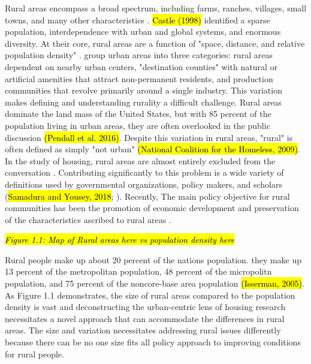  Rural areas encompass a broad spectrum, including farms, ranches, villages, small towns, and many other characteristics \citep{cromartie_defining_2008}.  \hl{Castle (1998)} identified a sparse population, interdependence with urban and global systems, and enormous diversity.  At their core, rural areas are a function of "space, distance, and relative population density" \citep[?]{castle_place_2011}.\citet{shoup_principles_2010} group urban areas into three categories: rural areas dependent on nearby urban centers, "destination counties" with natural or artificial amenities that attract non-permanent residents, and production communities that revolve primarily around a single industry. This variation  makes defining and understanding rurality a difficult challenge. Rural areas dominate the land mass of the United States, but with 85 percent of the population living in urban areas, they are often overlooked in the public discussion \hl{(Pendall et al. 2016)}. Despite this variation in rural areas,  "rural" is often defined as simply "not urban" \hl{(National Coalition for the Homeless, 2009)}. In the study of housing, rural areas are almost entirely excluded from the conversation \citep{gkartzios_housing_2017}. Contributing significantly to this problem is a wide variety of definitions used by governmental organizations, policy makers, and scholars (\hl{Samadura and Yousey, 2018}; \citealp{cromartie_defining_2008}). Recently, The main policy objective for rural communities has been the promotion of economic development and preservation of the characteristics ascribed to rural areas \citep{lichter_changing_2007}. 

\textit{\hl{Figure 1.1: Map of Rural areas here vs population density here}} %

Rural people make up about 20 percent of the nations population. they make up 13 percent of the metropolitan population, 48 percent of the micropolitn population, and 75 percent of the noncore-base area population \hl{(Isserman, 2005)}. As Figure 1.1 demonstrates, the size of rural areas compared to the population density is vast and deconstructing the urban-centric lens of housing research necessitates a novel approach that can accommodate the differences in rural areas. The size and variation necessitates addressing rural issues differently because there can be no one size fits all policy approach to improving conditions for rural people. 

